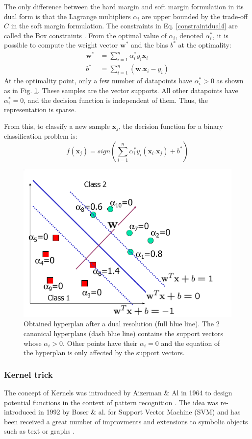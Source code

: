 \noindent The only difference between the hard margin and soft margin formulation in its dual form is that the Lagrange multipliers $\alpha_i$ are upper bounded by the trade-off $C$ in the soft margin formulation. The constraints in Eq. \ref{constraintdual4} are called the Box constraints \cite{Campbell2011}. From the optimal value of $\alpha_i$, denoted $\alpha_i^*$, it is possible to compute the weight vector $\textbf{w}^*$ and the bias $b^*$ at the optimality:
\begin{align}
	\textbf{w}^* & = \sum\limits_{i=1}^{n}\alpha_i^* y_i \textbf{x}_i \\
	b^* & = \sum\limits_{i=1}^{n} (\textbf{w}.\textbf{x}_i - y_i)
\end{align}
At the optimality point, only a few number of datapoints have $\alpha_i^* > 0$ as shown as in Fig. \ref{fig:SVM_SV}. These samples are the vector supports. All other datapoints have $\alpha_i^*=0$, and the decision function is independent of them. Thus, the representation is sparse. 

\noindent From this, to classify a new sample $\textbf{x}_j$, the decision function for a binary classification problem is:
\begin{equation}
	f(\textbf{x}_j) = sign(\sum\limits_{i=1}^{n} \alpha_i^*y_i(\textbf{x}_i.\textbf{x}_j) + b^*) \label{decisionDual}
\end{equation} 

\begin{figure}[h!]
\centering
\includegraphics[width=0.6\linewidth]{images/SVM_SV}
\caption{Obtained hyperplan after a dual resolution (full blue line). The 2 canonical hyperplans (dash blue line) contains the support vectors whose $\alpha_i > 0$. Other points have their $\alpha_i = 0$ and the equation of the hyperplan is only affected by the support vectors.}
\label{fig:SVM_SV}
\end{figure}


\subsubsection{Kernel trick}
The concept of Kernels was introduced by Aizerman \& Al in 1964 to design potential functions in the context of pattern recognition \cite{Aizerman1964}. The idea was re-introduced in 1992 by Boser \& al. for Support Vector Machine (SVM) and has been received a great number of improvments and extensions to symbolic objects such as text or graphs \cite{Boser1992}.

